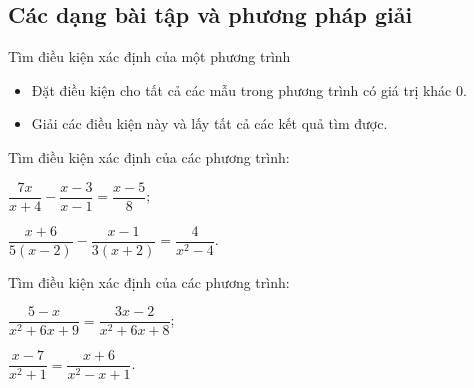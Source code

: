 {\subsection{Các dạng bài tập và phương pháp giải}
\begin{dang}{Tìm điều kiện xác định của một phương trình}
	\begin{itemize}
		\item Đặt điều kiện cho tất cả các mẫu trong phương trình có giá trị khác $0$.
		\item Giải các điều kiện này và lấy tất cả các kết quả tìm được.
	\end{itemize}
\end{dang}
\begin{vd}%
	Tìm điều kiện xác định của các phương trình:
	\begin{enumEX}{2}
		\item $\dfrac {7x} {x + 4} - \dfrac {x - 3} {x - 1} = \dfrac {x - 5} {8};$	
		\item $\dfrac {x + 6} {5 (x - 2)} - \dfrac {x - 1} {3(x + 2)} = \dfrac {4}{x^2 - 4}.$
	\end{enumEX}
\end{vd}
\begin{vd}%
	Tìm điều kiện xác định của các phương trình:
	\begin{enumEX}{2}
		\item $\dfrac{5 - x}{x^2 + 6x + 9} = \dfrac{3x - 2}{x^2 + 6x + 8}$;
		\item $\dfrac{x - 7}{x^2 + 1} = \dfrac{x + 6}{x^2 - x + 1}$.
	\end{enumEX}
\end{vd}}
